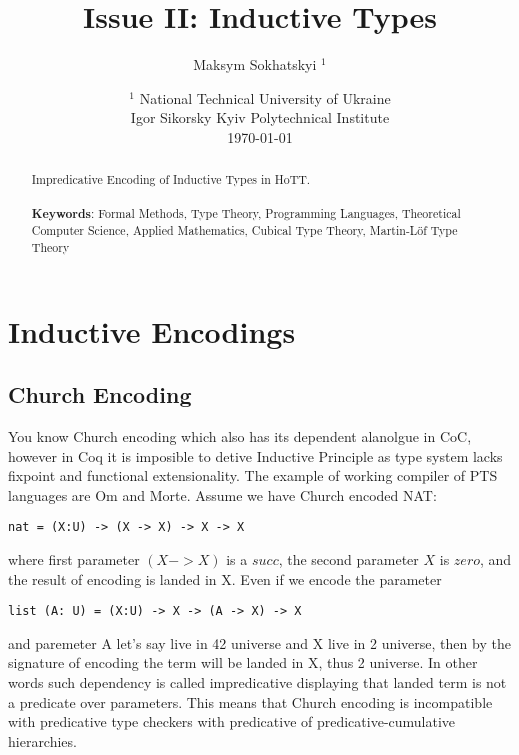 \documentclass{article}
\begin{document}
\title{Issue II: Inductive Types}
\author{Maksym Sokhatskyi $^1$}
\date{ $^1$ National Technical University of Ukraine \\
       \small Igor Sikorsky Kyiv Polytechnical Institute \\
       \today }

\maketitle

\begin{abstract}

Impredicative Encoding of Inductive Types in HoTT.
\\
\\
{\bf Keywords}: Formal Methods, Type Theory, Programming Languages,
          Theoretical Computer Science, Applied Mathematics,
          Cubical Type Theory, Martin-Löf Type Theory
\end{abstract}

\ifincludeTOC
  \tableofcontents
\fi

\newpage
\section{Inductive Encodings}

\subsection{Church Encoding}

You know Church encoding which also has its dependent alanolgue in CoC, however
in Coq it is imposible to detive Inductive Principle as type system lacks fixpoint
and functional extensionality. The example of working compiler of PTS languages are Om and Morte.
Assume we have Church encoded NAT:

\begin{lstlisting}[mathescape=true]
nat = (X:U) -> (X -> X) -> X -> X
\end{lstlisting}

where first parameter $(X -> X)$ is a $succ$, the second parameter $X$ is $zero$,
and the result of encoding is landed in X. Even if we encode the parameter

\begin{lstlisting}[mathescape=true]
list (A: U) = (X:U) -> X -> (A -> X) -> X
\end{lstlisting}

and paremeter A let's say live in 42 universe and X live in 2 universe, then by
the signature of encoding the term will be landed in X, thus 2 universe. In other words
such dependency is called impredicative displaying that landed term is not a predicate over parameters.
This means that Church encoding is incompatible with predicative type checkers with predicative
of predicative-cumulative hierarchies.
\end{document}
